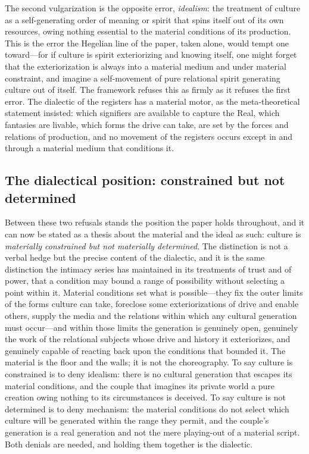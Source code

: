The second vulgarization is the opposite error, \emph{idealism}: the treatment of culture as a self-generating order of meaning or spirit that spins itself out of its own resources, owing nothing essential to the material conditions of its production. This is the error the Hegelian line of the paper, taken alone, would tempt one toward---for if culture is spirit exteriorizing and knowing itself, one might forget that the exteriorization is always into a material medium and under material constraint, and imagine a self-movement of pure relational spirit generating culture out of itself. The framework refuses this as firmly as it refuses the first error. The dialectic of the registers has a material motor, as the meta-theoretical statement insisted: which signifiers are available to capture the Real, which fantasies are livable, which forms the drive can take, are set by the forces and relations of production, and no movement of the registers occurs except in and through a material medium that conditions it.

\subsection*{The dialectical position: constrained but not determined}

Between these two refusals stands the position the paper holds throughout, and it can now be stated as a thesis about the material and the ideal as such: culture is \emph{materially constrained but not materially determined}. The distinction is not a verbal hedge but the precise content of the dialectic, and it is the same distinction the intimacy series has maintained in its treatments of trust and of power, that a condition may bound a range of possibility without selecting a point within it. Material conditions set what is possible---they fix the outer limits of the forms culture can take, foreclose some exteriorizations of drive and enable others, supply the media and the relations within which any cultural generation must occur---and within those limits the generation is genuinely open, genuinely the work of the relational subjects whose drive and history it exteriorizes, and genuinely capable of reacting back upon the conditions that bounded it. The material is the floor and the walls; it is not the choreography. To say culture is constrained is to deny idealism: there is no cultural generation that escapes its material conditions, and the couple that imagines its private world a pure creation owing nothing to its circumstances is deceived. To say culture is not determined is to deny mechanism: the material conditions do not select which culture will be generated within the range they permit, and the couple's generation is a real generation and not the mere playing-out of a material script. Both denials are needed, and holding them together is the dialectic.

